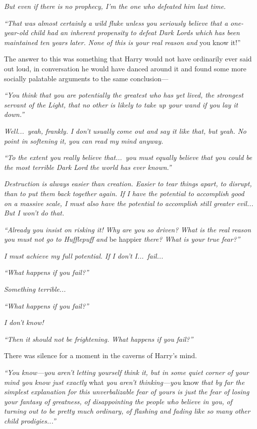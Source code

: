\emph{But even if there is no prophecy, I’m the one who defeated him last time.}

\emph{“That was almost certainly a wild fluke unless you seriously believe that a one-year-old child had an inherent propensity to defeat Dark Lords which has been maintained ten years later. None of this is your real reason and} you know it!”

The answer to this was something that Harry would not have ordinarily ever said out loud, in conversation he would have danced around it and found some more socially palatable arguments to the same conclusion—

\emph{“You think that you are potentially the greatest who has yet lived, the strongest servant of the Light, that no other is likely to take up your wand if you lay it down.”}

\emph{Well...\ yeah, frankly. I don’t usually come out and say it like that, but yeah. No point in softening it, you can read my mind anyway.}

\emph{“To the extent you really believe that...\ you must equally believe that you could be the most terrible Dark Lord the world has ever known.”}

\emph{Destruction is always easier than creation. Easier to tear things apart, to disrupt, than to put them back together again. If I have the potential to accomplish good on a massive scale, I must also have the potential to accomplish still greater evil... But I won’t do that.}

\emph{“Already you insist on risking it! Why are you so driven? What is the real reason you must not go to Hufflepuff and} be happier \emph{there? What is your true fear?”}

\emph{I must achieve my full potential. If I don’t I...\ fail...}

\emph{“What happens if you fail?”}

\emph{Something terrible...}

\emph{“What happens if you fail?”}

\emph{I don’t know!}

\emph{“Then it should not be frightening. What happens if you fail?”}


There was silence for a moment in the caverns of Harry’s mind.

\emph{“You know—you aren’t letting yourself think it, but in some quiet corner of your mind you know just exactly} what \emph{you aren’t thinking—you} know \emph{that by far the simplest explanation for this unverbalizable fear of yours is just the fear of losing your fantasy of greatness, of disappointing the people who believe in you, of turning out to be pretty much ordinary, of flashing and fading like so many other child prodigies...”}

